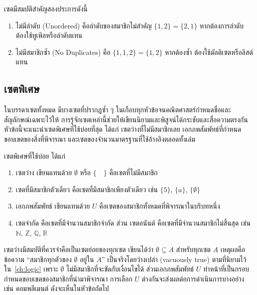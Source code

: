 \begin{rem}
เซตมีสมบัติสำคัญสองประการดังนี้
\begin{enumerate}
    \item ไม่มีลำดับ (Unordered) คือลำดับของสมาชิกไม่สำคัญ $\{1, 2\} = \{2, 1\}$ หากต้องการลำดับ ต้องใช้ทูเพิลหรือลำดับแทน
    \item ไม่มีสมาชิกซ้ำ (No Duplicates) คือ $\{1, 1, 2\} = \{1, 2\}$ หากต้องซ้ำ ต้องใช้มัลติเซตหรือลิสต์แทน
\end{enumerate}
\end{rem}


\subsection{เซตพิเศษ}
ในบรรดาเซตทั้งหมด มีบางเซตที่ปรากฏซ้ำ ๆ ในเกือบทุกหัวข้อจนคณิตศาสตร์กำหนดชื่อและสัญลักษณ์เฉพาะไว้ให้ การรู้จักเซตเหล่านี้ช่วยให้เขียนนิยามและพิสูจน์ได้กระชับและสื่อความตรงกัน หัวข้อนี้จะแนะนำเซตพิเศษที่ใช้บ่อยที่สุด ได้แก่ เซตว่างที่ไม่มีสมาชิกเลย เอกภพสัมพัทธ์ที่กำหนดขอบเขตของสิ่งที่พิจารณา และเซตของจำนวนมาตรฐานที่ใช้อ้างอิงตลอดทั้งเล่ม~\parencite{epp2019discrete}

\begin{definition}
เซตพิเศษที่ใช้บ่อย ได้แก่
\begin{enumerate}
    \item เซตว่าง เขียนแทนด้วย $\emptyset$ หรือ $\{\quad\}$ คือเซตที่ไม่มีสมาชิก
    \item เซตที่มีสมาชิกตัวเดียว คือเซตที่มีสมาชิกเพียงตัวเดียว เช่น $\{5\}$, $\{a\}$, $\{\emptyset\}$
    \item เอกภพสัมพัทธ์ เขียนแทนด้วย $U$ คือเซตของสมาชิกทั้งหมดที่พิจารณาในบริบทหนึ่ง
    \item เซตจำกัด คือเซตที่มีจำนวนสมาชิกจำกัด ส่วน เซตอนันต์ คือเซตที่มีจำนวนสมาชิกไม่สิ้นสุด เช่น $\mathbb{N}$, $\mathbb{Z}$, $\mathbb{Q}$, $\mathbb{R}$
\end{enumerate}
\label{def:special-sets}
\end{definition}

เซตว่างมีสมบัติที่ควรจำคือเป็นเซตย่อยของทุกเซต เขียนได้ว่า $\emptyset \subseteq A$ สำหรับทุกเซต $A$ เหตุผลคือข้อความ ``สมาชิกทุกตัวของ $\emptyset$ อยู่ใน $A$'' เป็นจริงโดยว่างเปล่า (vacuously true) ตามที่นิยามไว้ใน~\autoref{ch:logic} เพราะ $\emptyset$ ไม่มีสมาชิกที่จะขัดกับเงื่อนไขได้ ส่วนเอกภพสัมพัทธ์ $U$ ทำหน้าที่เป็นกรอบกำหนดขอบเขตของสมาชิกที่นำมาพิจารณา การเลือก $U$ ต่างกันจะส่งผลต่อการดำเนินการบางอย่าง เช่น คอมพลีเมนต์ ดังจะเห็นในหัวข้อถัดไป

